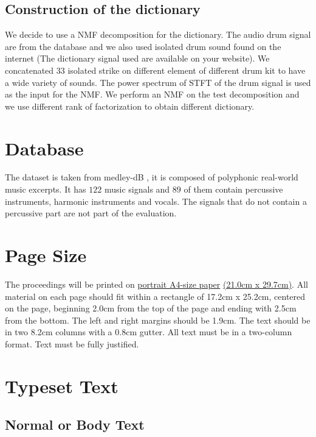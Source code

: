 \documentclass{article}
\begin{document}
\subsection{Construction of the dictionary}

We decide to use a NMF decomposition for the dictionary. The audio drum signal are from the database \cite{gillet2006enst} and we also used isolated drum sound found on the internet (The dictionary signal used are available on your website). We concatenated $33$ isolated strike on different element of different drum kit to have a wide variety of sounds. The power spectrum of STFT of the drum signal is used as the input for the NMF. We perform an NMF on the test decomposition and we use different rank of factorization to obtain different dictionary.



\section{Database}\label{database}

The dataset is taken from medley-dB \cite{bittner2014medleydb}, it is composed of polyphonic real-world music excerpts. It has $122$ music signals and $89$ of them contain percussive instruments, harmonic instruments and vocals. The signals that do not contain a percussive part are not part of the evaluation. 





\section{Page Size}\label{sec:page_size}

The proceedings will be printed on
 \underline{portrait A4-size paper} \underline{(21.0cm x 29.7cm)}.
All material on each page should fit within a rectangle of 17.2cm x 25.2cm,
centered on the page, beginning 2.0cm
from the top of the page and ending with 2.5cm from the bottom.
The left and right margins should be 1.9cm.
The text should be in two 8.2cm columns with a 0.8cm gutter.
All text must be in a two-column format.
Text must be fully justified.

\section{Typeset Text}\label{sec:typeset_text}

\subsection{Normal or Body Text}\label{subsec:body}
\end{document}

